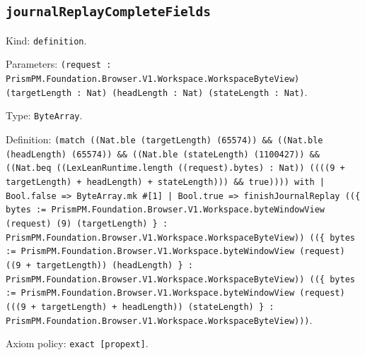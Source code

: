 \documentclass[11pt]{article}
\begin{document}
\subsection*{\texttt{journalReplayCompleteFields}}
\noindent Kind: \texttt{definition}.\par
\noindent Parameters: \texttt{(request : PrismPM.Foundation.Browser.V1.Workspace.WorkspaceByteView) (targetLength : Nat) (headLength : Nat) (stateLength : Nat)}.\par
\noindent Type: \texttt{ByteArray}.\par
\noindent Definition: \texttt{(match ((Nat.ble (targetLength) (65574)) \&\& ((Nat.ble (headLength) (65574)) \&\& ((Nat.ble (stateLength) (1100427)) \&\& ((Nat.beq ((LexLeanRuntime.length ((request).bytes) : Nat)) ((((9 + targetLength) + headLength) + stateLength))) \&\& true)))) with | Bool.false => ByteArray.mk \#[1] | Bool.true => finishJournalReplay ((\{ bytes := PrismPM.Foundation.Browser.V1.Workspace.byteWindowView (request) (9) (targetLength) \} : PrismPM.Foundation.Browser.V1.Workspace.WorkspaceByteView)) ((\{ bytes := PrismPM.Foundation.Browser.V1.Workspace.byteWindowView (request) ((9 + targetLength)) (headLength) \} : PrismPM.Foundation.Browser.V1.Workspace.WorkspaceByteView)) ((\{ bytes := PrismPM.Foundation.Browser.V1.Workspace.byteWindowView (request) (((9 + targetLength) + headLength)) (stateLength) \} : PrismPM.Foundation.Browser.V1.Workspace.WorkspaceByteView)))}.\par
\noindent Axiom policy: \texttt{exact [propext]}.\par
\end{document}
